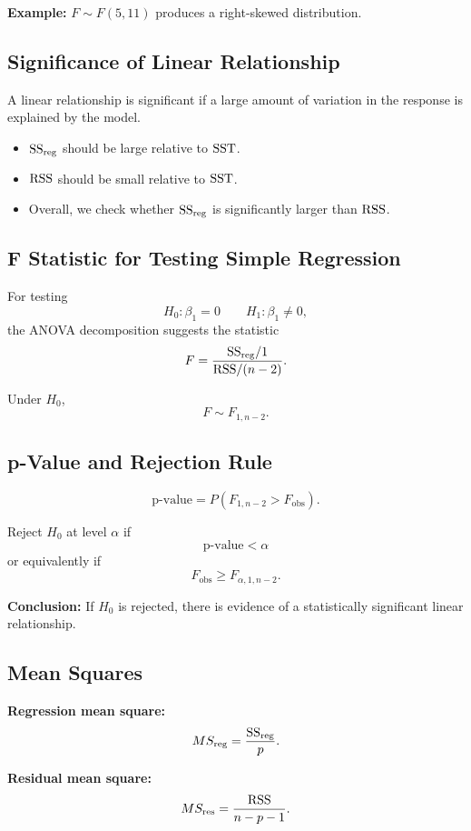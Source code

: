 \textbf{Example:} $F \sim F(5,11)$ produces a right-skewed distribution.

\subsection{Significance of Linear Relationship}

A linear relationship is significant if a large amount of variation in the response is explained by the model.

\begin{itemize}
\item $\mathrm{SS}_{\mathrm{reg}}$ should be large relative to $\mathrm{SST}$.
\item $\mathrm{RSS}$ should be small relative to $\mathrm{SST}$.
\item Overall, we check whether $\mathrm{SS}_{\mathrm{reg}}$ is significantly larger than $\mathrm{RSS}$.
\end{itemize}

\subsection{F Statistic for Testing Simple Regression}

For testing
\[
H_0:\beta_1 = 0
\qquad
H_1:\beta_1 \neq 0,
\]
the ANOVA decomposition suggests the statistic
\[
F =
\frac{\mathrm{SS}_{\mathrm{reg}}/1}{\mathrm{RSS}/(n-2)}.
\]

Under $H_0$,
\[
F \sim F_{1,n-2}.
\]

\subsection{p-Value and Rejection Rule}

\[
\text{p-value} = P(F_{1,n-2} > F_{\text{obs}}).
\]

Reject $H_0$ at level $\alpha$ if
\[
\text{p-value} < \alpha
\]
or equivalently if
\[
F_{\text{obs}} \ge F_{\alpha,1,n-2}.
\]

\textbf{Conclusion:} If $H_0$ is rejected, there is evidence of a statistically significant linear relationship.

\subsection{Mean Squares}

\textbf{Regression mean square:}
\[
MS_{\text{reg}} = \frac{\mathrm{SS}_{\mathrm{reg}}}{p}.
\]

\textbf{Residual mean square:}
\[
MS_{\text{res}} = \frac{\mathrm{RSS}}{n-p-1}.
\]

